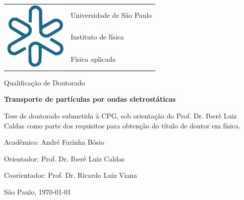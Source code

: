 \documentclass[12pt,a4paper]{article}
\begin{document}
\begin{titlepage}
    \begin{center}
        \begin{tabular}{m{4cm}m{10cm}}
            \multirow{3}{*}{\vspace{-0.5cm}\includegraphics[width=3cm]{if.png}}
            & {\LARGE Universidade de São Paulo} \\
            & {\LARGE Instituto de física} \\
            & {\LARGE Física aplicada} \\
        \end{tabular}
        \vspace{1.8cm}
    
        {\LARGE Qualificação de Doutorado}
        \vspace{4.0cm}

        {\LARGE {\bf Transporte de partículas por ondas eletrostáticas}}
        \vfill

        \hspace*{7.0cm}\parbox{9.0cm}
        {\large Tese de doutorado submetida à CPG, sob orientação do Prof. Dr. Iberê Luiz Caldas como parte dos requisitos para obtenção do título de doutor em física.}
        \vfill
    
         {\Large Acadêmico: André Farinha Bósio}
        \vspace{0.8cm}
    
        {\Large Orientador: Prof. Dr. Iberê Luiz Caldas}
        \vspace{0.8cm}
        
        {\Large Coorientador: Prof. Dr. Ricardo Luiz Viana}
        \vspace{0.8cm}
        
        
        \vspace{1.2cm}
        
        {\large São Paulo, \today}
    
    \end{center}
\end{titlepage}


\clearpage
\tableofcontents
\end{document}
